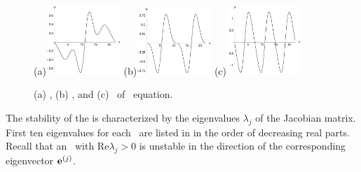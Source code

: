 \begin{figure}[t]
\begin{center}
(a)\includegraphics[width=0.25\textwidth]{figs/1wKS22equil.eps}
(b)\includegraphics[width=0.25\textwidth]{figs/2wKS22equil.eps}
(c)\includegraphics[width=0.25\textwidth]{figs/3wKS22equil.eps}
\end{center}
\caption{
(a) , (b) , and (c)
 \eqva\ of \KS\ equation.
}
\label{f:KS22Equil}
\end{figure}

The stability of the {\eqva} is characterized by the eigenvalues
$\lambda_j$ of the Jacobian matrix.  First ten eigenvalues for each
\eqv\ are listed in  in the order of
decreasing real parts. Recall that an \eqv\ with $\mathrm{Re}
\lambda_j > 0$ is unstable in the direction of the corresponding
eigenvector ${\mathbf e}^{(j)}$.

